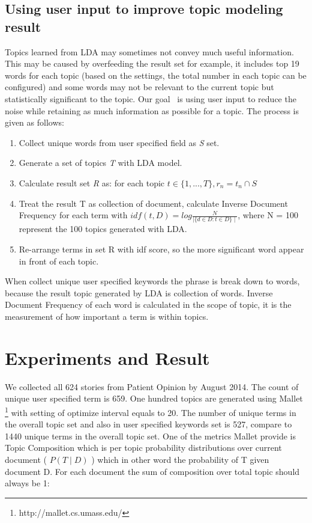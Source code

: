\documentclass[11pt,twoside]{report}
\begin{document}
\section{Using user input to improve topic modeling result}

Topics learned from LDA may sometimes not convey much useful information. This may be caused by overfeeding the result set for example, it includes top 19 words for each topic (based on the settings, the total number in each topic can be configured) and some words may not be relevant to the current topic but statistically significant to the topic. Our goal  is using user input to reduce the noise while retaining as much information as possible for a topic. The process is given as follows: 
\begin{enumerate}
\item Collect unique words from user specified field as \textit{S} set.
\item Generate a set of topics \textit{T} with LDA model.
\item Calculate result set \textit{R} as: for each topic $t\in\{1,...,T\}, r_n = t_n \cap S$
\item Treat the result T as collection of document, calculate Inverse Document Frequency for each term with $idf(t, D) = log\frac{N}{\mid \{d\in D : t\in D\}\mid}$, where N = 100 represent the 100 topics generated with LDA. 
\item Re-arrange terms in set R with idf score, so the more significant word appear in front of each topic.
\end{enumerate}

When collect unique user specified keywords the phrase is break down to words, because the result topic generated by LDA is collection of words. Inverse Document Frequency of each word is calculated in the scope of topic, it is the measurement of how important a term is within topics. 
\chapter{Experiments and Result}

We collected all 624 stories from Patient Opinion by August 2014. The count of unique user specified term is 659. One hundred topics are generated using Mallet \footnote{http://mallet.cs.umass.edu/} with setting of optimize interval equals to 20.  The number of unique terms in the overall topic set and also in user specified keywords set is 527, compare to 1440 unique terms in the overall topic set. One of the metrics Mallet provide is Topic Composition which is per topic probability distributions over current document ( $P(T \mid D)$ ) which in other word the probability of T given document D. For each document the sum of composition over total topic should always be 1:
\end{document}
